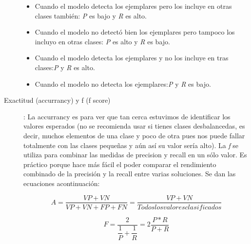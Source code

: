 \begin{description}
    \begin{itemize}
     \item Cuando el modelo detecta los ejemplares pero los incluye en otras clases también: \emph{P} es bajo y \emph{R} es alto. 
     \item Cuando el modelo no detectó bien los ejemplares pero tampoco los incluyo en otras clases: \emph{P} es alto y \emph{R} es bajo. 
     \item Cuando el modelo detecta los ejemplares y no los incluye en tras clases:\emph{P} y \emph{R} es alto. 
     \item Cuando el modelo no detecta los ejemplares:\emph{P} y \emph{R} es bajo. 
     \end{itemize}

 \item [Exactitud (accurrancy) y f (f score)]: La accurrancy es para ver que tan cerca estuvimos de identificar los valores esperados (no se recomienda usar si tienes clases desbalancedas, es decir, muchos elementos de una clase y poco de otra pues nos puede fallar totalmente con las clases pequeñas y aún así su valor sería alto). La \emph{f} se utiliza para combinar las medidas de precision y recall en un sólo valor. Es práctico porque hace más fácil el poder comparar el rendimiento combinado de la precisión y la recall entre varias soluciones. Se dan las ecuaciones acontinuación:
    
    \begin{equation}
     A = \dfrac{VP+VN}{VP + VN + FP + FN} = \dfrac{VP+VN}{Todos los valores clasificados}     
    \end{equation}

    \begin{equation}
     F = \dfrac{2}{\dfrac{1}{P} +\dfrac{1}{R} }= 2 \dfrac{P * R}{P + R}
    \end{equation}

\end{description}

